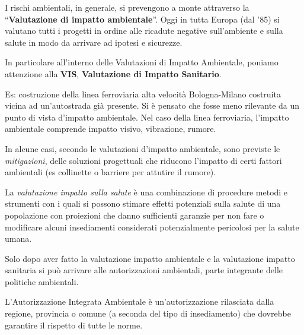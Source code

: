 \documentclass[]{article}
\begin{document}
I rischi ambientali, in generale, si prevengono a monte attraverso la
``\textbf{Valutazione di impatto ambientale}''. Oggi in tutta Europa
(dal '85) si valutano tutti i progetti in ordine alle ricadute negative
sull'ambiente e sulla salute in modo da arrivare ad ipotesi e sicurezze.

In particolare all'interno delle Valutazioni di Impatto Ambientale,
poniamo attenzione alla \textbf{VIS}, \textbf{Valutazione di Impatto
Sanitario}.

Es: costruzione della linea ferroviaria alta velocità Bologna-Milano
costruita vicina ad un'autostrada già presente. Si è pensato che fosse
meno rilevante da un punto di vista d'impatto ambientale. Nel caso della
linea ferroviaria, l'impatto ambientale comprende impatto visivo,
vibrazione, rumore.

In alcune casi, secondo le valutazioni d'impatto ambientale, sono
previste le \emph{mitigazioni}, delle soluzioni progettuali che riducono
l'impatto di certi fattori ambientali (es collinette o barriere per
attutire il rumore).

La \emph{valutazione impatto sulla salute} è una combinazione di
procedure metodi e strumenti con i quali si possono stimare effetti
potenziali sulla salute di una popolazione con proiezioni che danno
sufficienti garanzie per non fare o modificare alcuni insediamenti
considerati potenzialmente pericolosi per la salute umana.

Solo dopo aver fatto la valutazione impatto ambientale e la valutazione
impatto sanitaria si può arrivare alle autorizzazioni ambientali, parte
integrante delle politiche ambientali.

L'Autorizzazione Integrata Ambientale è un'autorizzazione rilasciata
dalla regione, provincia o comune (a seconda del tipo di insediamento)
che dovrebbe garantire il rispetto di tutte le norme.
\end{document}
